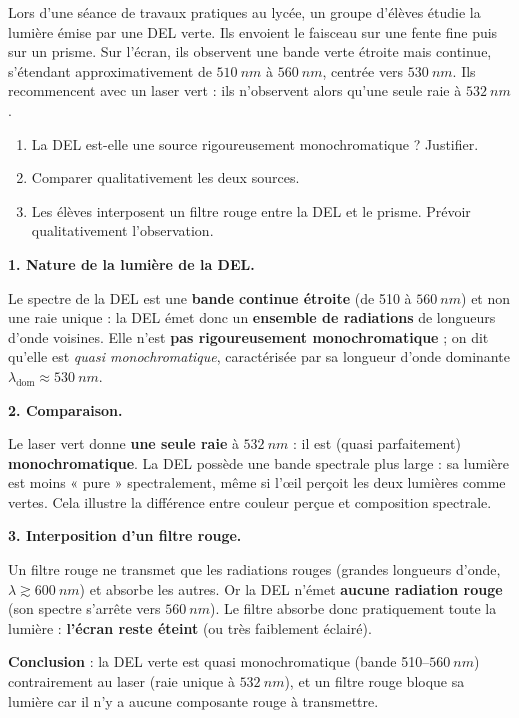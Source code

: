 \documentclass[11pt]{article}
\begin{document}
\begin{exoresolu}
Lors d'une séance de travaux pratiques au lycée, un groupe d'élèves étudie la lumière émise par une DEL verte. Ils envoient le faisceau sur une fente fine puis sur un prisme. Sur l'écran, ils observent une bande verte étroite mais continue, s'étendant approximativement de $\SI{510}{nm}$ à $\SI{560}{nm}$, centrée vers $\SI{530}{nm}$. Ils recommencent avec un laser vert : ils n'observent alors qu'une seule raie à $\SI{532}{nm}$.
\begin{enumerate}
\item La DEL est-elle une source rigoureusement monochromatique ? Justifier.
\item Comparer qualitativement les deux sources.
\item Les élèves interposent un filtre rouge entre la DEL et le prisme. Prévoir qualitativement l'observation.
\end{enumerate}
\tcblower
\textbf{1. Nature de la lumière de la DEL.}

Le spectre de la DEL est une \textbf{bande continue étroite} (de 510 à $\SI{560}{nm}$) et non une raie unique : la DEL émet donc un \textbf{ensemble de radiations} de longueurs d'onde voisines. Elle n'est \textbf{pas rigoureusement monochromatique} ; on dit qu'elle est \emph{quasi monochromatique}, caractérisée par sa longueur d'onde dominante $\lambda_{\text{dom}} \approx \SI{530}{nm}$.

\textbf{2. Comparaison.}

Le laser vert donne \textbf{une seule raie} à $\SI{532}{nm}$ : il est (quasi parfaitement) \textbf{monochromatique}. La DEL possède une bande spectrale plus large : sa lumière est moins « pure » spectralement, même si l'œil perçoit les deux lumières comme vertes. Cela illustre la différence entre couleur perçue et composition spectrale.

\textbf{3. Interposition d'un filtre rouge.}

Un filtre rouge ne transmet que les radiations rouges (grandes longueurs d'onde, $\lambda \gtrsim \SI{600}{nm}$) et absorbe les autres. Or la DEL n'émet \textbf{aucune radiation rouge} (son spectre s'arrête vers $\SI{560}{nm}$). Le filtre absorbe donc pratiquement toute la lumière : \textbf{l'écran reste éteint} (ou très faiblement éclairé).

\textbf{Conclusion} : la DEL verte est quasi monochromatique (bande 510--$\SI{560}{nm}$) contrairement au laser (raie unique à $\SI{532}{nm}$), et un filtre rouge bloque sa lumière car il n'y a aucune composante rouge à transmettre.
\end{exoresolu}
\end{document}
